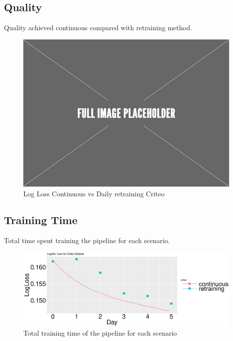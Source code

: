 \documentclass[10pt,conference,letterpaper]{IEEEtran}
\begin{document}
\subsection{Quality}
Quality achieved continuous compared with retraining method.
\begin{figure}[h]
\centering
\includegraphics[width=\columnwidth]{../images/placeholder.jpeg}
\caption{Log Loss Continuous vs Daily retraining Criteo }
\label{fig:continuous-vs-daily-criteo}
\vspace{2mm}
\end{figure}

\subsection{Training Time}
Total time spent training the pipeline for each scenario.
\begin{figure}[h]
\centering
\includegraphics[width=\columnwidth]{../images/experiment-results/criteo-log-loss-continuous-vs-daily.eps}
\caption{Total training time of the pipeline for each scenario}
\label{fig:training-time-criteo}
\vspace{2mm}
\end{figure}
\end{document}
